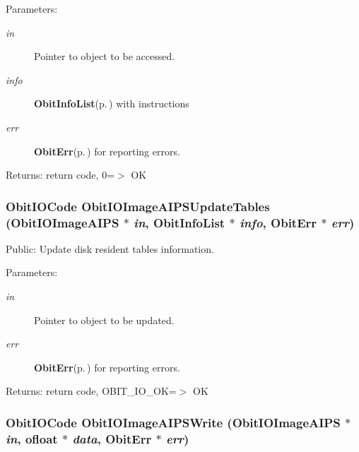 \begin{Desc}
\item[Parameters:]
\begin{description}
\item[{\em in}]Pointer to object to be accessed. \item[{\em info}]{\bf Obit\-Info\-List}{\rm (p.\,\pageref{structObitInfoList})} with instructions \item[{\em err}]{\bf Obit\-Err}{\rm (p.\,\pageref{structObitErr})} for reporting errors. \end{description}
\end{Desc}
\begin{Desc}
\item[Returns:]return code, 0=$>$ OK \end{Desc}
\subsubsection{\setlength{\rightskip}{0pt plus 5cm}Obit\-IOCode Obit\-IOImage\-AIPSUpdate\-Tables ({\bf Obit\-IOImage\-AIPS} $\ast$ {\em in}, {\bf Obit\-Info\-List} $\ast$ {\em info}, {\bf Obit\-Err} $\ast$ {\em err})}\label{ObitIOImageAIPS_8c_a22}


Public: Update disk resident tables information. 

\begin{Desc}
\item[Parameters:]
\begin{description}
\item[{\em in}]Pointer to object to be updated. \item[{\em err}]{\bf Obit\-Err}{\rm (p.\,\pageref{structObitErr})} for reporting errors. \end{description}
\end{Desc}
\begin{Desc}
\item[Returns:]return code, OBIT\_\-IO\_\-OK=$>$ OK \end{Desc}
\subsubsection{\setlength{\rightskip}{0pt plus 5cm}Obit\-IOCode Obit\-IOImage\-AIPSWrite ({\bf Obit\-IOImage\-AIPS} $\ast$ {\em in}, {\bf ofloat} $\ast$ {\em data}, {\bf Obit\-Err} $\ast$ {\em err})}\label{ObitIOImageAIPS_8c_a16}


